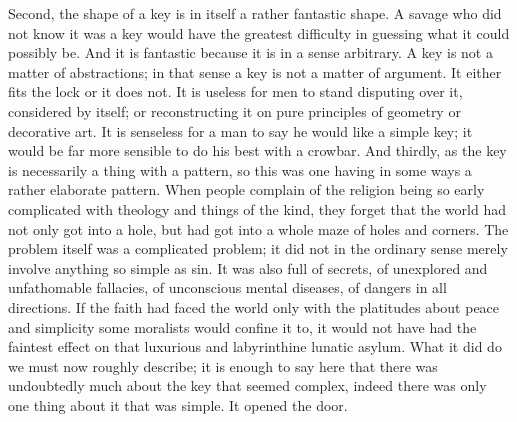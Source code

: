 Second, the shape of a key is in itself a rather fantastic shape. A savage who did not know it was a key would have the greatest difficulty in guessing what it could possibly be. And it is fantastic because it is in a sense arbitrary. A key is not a matter of abstractions; in that sense a key is not a matter of argument. It either fits the lock or it does not. It is useless for men to stand disputing over it, considered by itself; or reconstructing it on pure principles of geometry or decorative art. It is senseless for a man to say he would like a simple key; it would be far more sensible to do his best with a crowbar. And thirdly, as the key is necessarily a thing with a pattern, so this was one having in some ways a rather elaborate pattern. When people complain of the religion being so early complicated with theology and things of the kind, they forget that the world had not only got into a hole, but had got into a whole maze of holes and corners. The problem itself was a complicated problem; it did not in the ordinary sense merely involve anything so simple as sin. It was also full of secrets, of unexplored and unfathomable fallacies, of unconscious mental diseases, of dangers in all directions. If the faith had faced the world only with the platitudes about peace and simplicity some moralists would confine it to, it would not have had the faintest effect on that luxurious and labyrinthine lunatic asylum. What it did do we must now roughly describe; it is enough to say here that there was undoubtedly much about the key that seemed complex, indeed there was only one thing about it that was simple. It opened the door.

